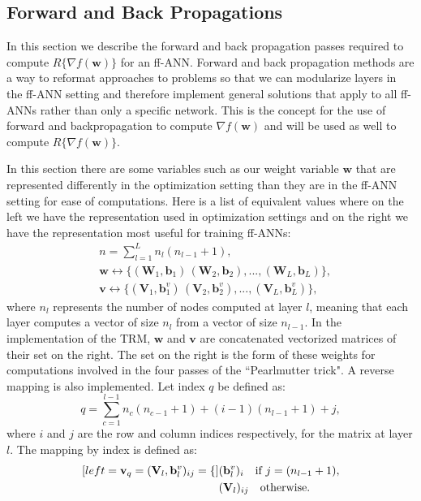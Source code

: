\documentclass[letterpaper,12pt,titlepage,oneside,final]{book}
\begin{document}
	\subsection{Forward and Back Propagations}
	\label{appendix:forandback}
	
	In this section we describe the forward and back propagation passes required to compute $R\{\nabla{f(\mathbf{w})}\}$ for an ff-ANN. Forward and back propagation methods are a way to reformat approaches to problems so that we can modularize layers in the ff-ANN setting and therefore implement general solutions that apply to all ff-ANNs rather than only a specific network. This is the concept for the use of forward and backpropagation to compute $\nabla{f(\mathbf{w})}$ and will be used as well to compute $R\{\nabla{f(\mathbf{w})}\}$.
	
	In this section there are some variables such as our weight variable $\mathbf{w}$ that are represented differently in the optimization setting than they are in the ff-ANN setting for ease of computations. Here is a list of equivalent values where on the left we have the representation used in optimization settings and on the right we have the representation most useful for training ff-ANNs:
	\begin{equation}
	\begin{split}
	&  n = \sum_{l=1}^{L}{n_{l}(n_{l-1}+1)} ,
	\\&    \mathbf{w} \leftrightarrow \{(\mathbf{W}_{1},\mathbf{b}_{1})\, (\mathbf{W}_{2},\mathbf{b}_{2}), ... , (\mathbf{W}_{L},\mathbf{b}_{L})\} ,
	\\&    \mathbf{v} \leftrightarrow \{(\mathbf{V}_{1},\mathbf{b}_{1}^{v})\, (\mathbf{V}_{2},\mathbf{b}_{2}^{v}), ... , (\mathbf{V}_{L},\mathbf{b}_{L}^{v})\} ,
	\label{equation:map}
	\end{split}    
	\end{equation}
	where $n_{l}$ represents the number of nodes computed at layer $l$, meaning that each layer computes a vector of size $n_{l}$ from a vector of size $n_{l-1}$. In the implementation of the TRM, $\mathbf{w}$ and $\mathbf{v}$ are concatenated vectorized matrices of their set on the right. The set on the right is the form of these weights for computations involved in the four passes of the ``Pearlmutter trick". A reverse mapping is also implemented. Let index $q$ be defined as:
	\begin{equation}
	q = \sum_{c=1}^{l-1}{n_{c}(n_{c-1}+1)} + (i-1)(n_{l-1}+1) + j,
	\label{equation:index}
	\end{equation}
	where $i$ and $j$ are the row and column indices respectively, for the matrix at layer $l$. The mapping by index is defined as:
	\begin{subequations}
		\begin{align}[left = {\mathbf{v}_{q} =(\mathbf{V}_{l},\mathbf{b}_{l}^{v})_{ij} = \empheqlbrace\,}]
		& (\mathbf{b}^{v}_{l})_{i}  \quad \text{if} \ j = (n_{l-1} + 1), \\
		& (\mathbf{V}_{l})_{ij} \quad  \text{otherwise}.
		\end{align}
		\label{equation:biasindex}
	\end{subequations}
	
\end{document}
